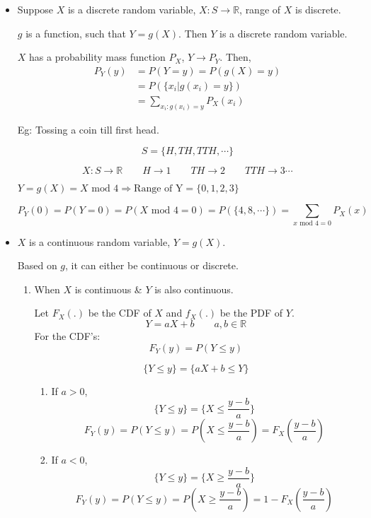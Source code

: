 \documentclass{article}
\begin{document}
\begin{itemize}
    \item
    Suppose $X$ is a discrete random variable, $X: S \to \mathbb{R}$, range of $X$ is discrete.

    $g$ is a function, such that $Y=g(X)$. Then $Y$ is a discrete random variable.

    $X$ has a probability mass function $P_X$, $Y \to P_Y$. Then,
    \begin{align*}
        P_Y(y)&= P(Y=y)= P(g(X)=y) \\
        &= P(\{ x_i | g(x_i)=y\}) \\
        &= \sum_{x_i : g(x_i)=y} P_X(x_i)
    \end{align*}

    Eg: Tossing a coin till first head.

    $$ S= \{ H,TH,TTH, \cdots\}$$

    $$X:S \to \mathbb{R}\qquad H \to 1 \qquad TH \to 2 \qquad TTH \to 3 \cdots$$

    $Y=g(X)= X \text{ mod } 4 \Rightarrow \text{Range of Y}= \{ 0,1,2,3\}$

    $$P_Y(0)= P(Y=0)= P(X \text{ mod } 4 =0)= P(\{ 4,8,\cdots\})= \sum_{x \text{ mod } 4=0}P_X(x)$$

    \item $X$ is a continuous random variable, $Y= g(X)$.

    Based on $g$, it can either be continuous or discrete.

    \begin{enumerate}
        \item When $X$ is continuous \& $Y$ is also continuous.

        Let $F_X(.)$ be the CDF of $X$ and $f_X(.)$ be the PDF of $Y$.
        $$ Y= aX+b \qquad a,b \in \mathbb{R}$$
        For the CDF's:
            $$F_Y(y)= P(Y \leq y) $$

        $$ \{ Y \leq y\}= \{ aX+b \leq Y\}$$
        \begin{enumerate}
            \item If $a>0$,
            $$ \{ Y \leq y\}  = \{ X \leq \frac{y-b}{a}\}$$
            $$ F_Y(y)= P(Y \leq y)= P\left( X \leq \frac{y-b}{a}\right)= F_X\left( \frac{y-b}{a}\right)$$
            \item If $a<0$,
            $$ \{ Y \leq y\}  = \{ X \geq \frac{y-b}{a}\}$$
            $$ F_Y(y)= P(Y \leq y)= P\left( X \geq \frac{y-b}{a}\right)= 1-F_X\left( \frac{y-b}{a}\right)$$
        \end{enumerate}


\end{enumerate}
\end{itemize}
\end{document}

